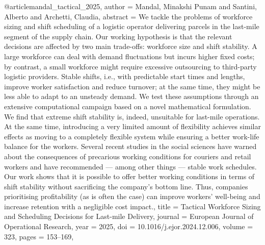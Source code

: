 @article{mandal_tactical_2025,
  author = {Mandal, Minakshi Punam and Santini, Alberto and Archetti, Claudia},
  abstract = {We tackle the problems of workforce sizing and shift scheduling of a logistic operator delivering parcels in the last-mile segment of the supply chain. Our working hypothesis is that the relevant decisions are affected by two main trade-offs: workforce size and shift stability. A large workforce can deal with demand fluctuations but incurs higher fixed costs; by contrast, a small workforce might require excessive outsourcing to third-party logistic providers. Stable shifts, i.e., with predictable start times and lengths, improve worker satisfaction and reduce turnover; at the same time, they might be less able to adapt to an unsteady demand. We test these assumptions through an extensive computational campaign based on a novel mathematical formulation. We find that extreme shift stability is, indeed, unsuitable for last-mile operations. At the same time, introducing a very limited amount of flexibility achieves similar effects as moving to a completely flexible system while ensuring a better work-life balance for the workers. Several recent studies in the social sciences have warned about the consequences of precarious working conditions for couriers and retail workers and have recommended — among other things — stable work schedules. Our work shows that it is possible to offer better working conditions in terms of shift stability without sacrificing the company's bottom line. Thus, companies prioritising profitability (as is often the case) can improve workers’ well-being and increase retention with a negligible cost impact.},
  title = {{Tactical} {Workforce} {Sizing} {and} {Scheduling} {Decisions} {for} {Last-mile} {Delivery}},
  journal = {European Journal of Operational Research},
  year = {2025},
  doi = {10.1016/j.ejor.2024.12.006},
  volume = {323},
  pages = {153--169},
}

